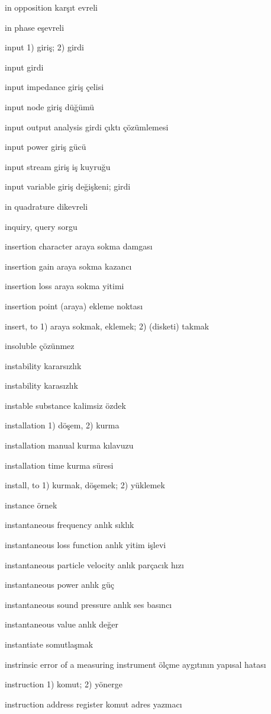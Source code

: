 \documentclass[12pt,fleqn]{article}\usepackage{../../common}
\begin{document}
in opposition karşıt evreli

in phase eşevreli

input 1) giriş; 2) girdi

input girdi

input impedance giriş çelisi

input node giriş düğümü

input output analysis girdi çıktı çözümlemesi

input power giriş gücü

input stream giriş iş kuyruğu

input variable giriş değişkeni; girdi

in quadrature dikevreli

inquiry, query sorgu

insertion character araya sokma damgası

insertion gain araya sokma kazancı

insertion loss araya sokma yitimi

insertion point (araya) ekleme noktası

insert, to 1) araya sokmak, eklemek; 2) (disketi) takmak

insoluble çözünmez

instability kararsızlık

instability karasızlık

instable substance kalimsiz özdek

installation 1) döşem, 2) kurma

installation manual kurma kılavuzu

installation time kurma süresi

install, to 1) kurmak, döşemek; 2) yüklemek

instance örnek

instantaneous frequency anlık sıklık

instantaneous loss function anlık yitim işlevi

instantaneous particle velocity anlık parçacık hızı

instantaneous power anlık güç

instantaneous sound pressure anlık ses basıncı

instantaneous value anlık değer

instantiate somutlaşmak

instrinsic error of a measuring instrument ölçme aygıtının yapısal hatası

instruction 1) komut; 2) yönerge

instruction address register komut adres yazmacı
\end{document}
